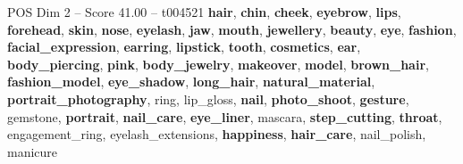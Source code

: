 \begin{textsample}{POS Dim 2 – Score 41.00 – t004521}  \label{ex:f2_pos_001}
\textbf{hair}, \textbf{chin}, \textbf{cheek}, \textbf{eyebrow}, \textbf{lips}, \textbf{forehead}, \textbf{skin}, \textbf{nose}, \textbf{eyelash}, \textbf{jaw}, \textbf{mouth}, \textbf{jewellery}, \textbf{beauty}, \textbf{eye}, \textbf{fashion}, \textbf{facial\_expression}, \textbf{earring}, \textbf{lipstick}, \textbf{tooth}, \textbf{cosmetics}, \textbf{ear}, \textbf{body\_piercing}, \textbf{pink}, \textbf{body\_jewelry}, \textbf{makeover}, \textbf{model}, \textbf{brown\_hair}, \textbf{fashion\_model}, \textbf{eye\_shadow}, \textbf{long\_hair}, \textbf{natural\_material}, \textbf{portrait\_photography}, ring, lip\_gloss, \textbf{nail}, \textbf{photo\_shoot}, \textbf{gesture}, gemstone, \textbf{portrait}, \textbf{nail\_care}, \textbf{eye\_liner}, mascara, \textbf{step\_cutting}, \textbf{throat}, engagement\_ring, eyelash\_extensions, \textbf{happiness}, \textbf{hair\_care}, nail\_polish, manicure

\end{textsample}

